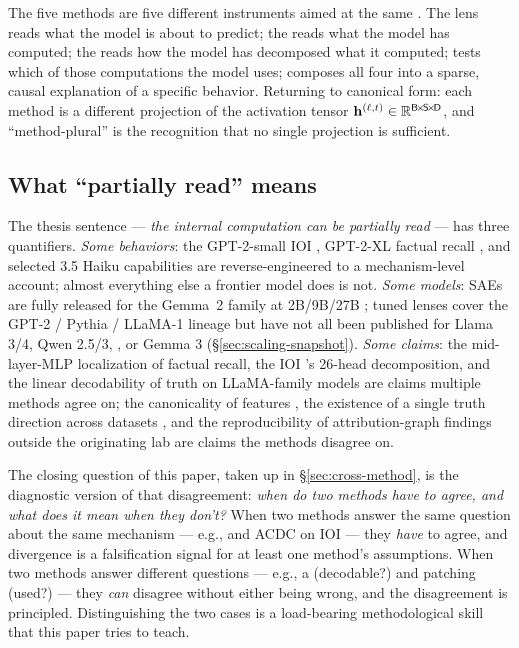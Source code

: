 \begin{intuition}
The five methods are five different instruments aimed at the same
. The lens reads what the model is about to predict;
the  reads what the model has computed; the  reads how the
model has decomposed what it computed;  tests
which of those computations the model uses; 
composes all four into a sparse, causal explanation of a specific
behavior. Returning to canonical form: each method is a different
projection of the activation tensor $\mathbf{h}^{(\ell, t)} \in
\mathbb{R}^{\mathsf{B}\!\times\!\mathsf{S}\!\times\!\mathsf{D}}$, and ``method-plural'' is the
recognition that no single projection is sufficient.
\end{intuition}

\subsection{What ``partially read'' means}
\label{sec:partially-read}

The thesis sentence --- \emph{the internal computation can be
partially read} --- has three quantifiers. \emph{Some behaviors}: the
GPT-2-small IOI  \citep{wang2022-ioi}, GPT-2-XL factual recall
\citep{meng2022-rome}, and selected  3.5 Haiku capabilities
\citep{lindsey2025-circuit-tracing} are reverse-engineered to a
mechanism-level account; almost everything else a frontier model does
is not. \emph{Some models}: SAEs are fully released for the Gemma~2
family at 2B/9B/27B \citep{gemma-scope-2024}; tuned lenses cover the
GPT-2 / Pythia / LLaMA-1 lineage \citep{belrose2023-tuned-lens} but
have not all been published for Llama 3/4, Qwen 2.5/3, , or
Gemma 3 (\S\ref{sec:scaling-snapshot}). \emph{Some claims}: the
mid-layer-MLP localization of factual recall, the IOI 's
26-head decomposition, and the linear decodability of truth on
LLaMA-family models are claims multiple methods agree on; the
canonicality of  features
\citep{leask2025-sae-not-canonical}, the existence of a single truth
direction across datasets \citep{marks-tegmark-2023-truth}, and the
reproducibility of attribution-graph findings outside the originating
lab are claims the methods disagree on.

The closing question of this paper, taken up in
\S\ref{sec:cross-method}, is the diagnostic version of that disagreement:
\emph{when do two methods have to agree, and what does it mean when
they don't?} When two methods answer the same question about the same
mechanism --- e.g.,  and ACDC on IOI --- they
\emph{have} to agree, and divergence is a falsification signal for at
least one method's assumptions. When two methods answer different
questions --- e.g., a  (decodable?) and patching (used?) --- they
\emph{can} disagree without either being wrong, and the disagreement
is principled. Distinguishing the two cases is a load-bearing
methodological skill that this paper tries to teach.


